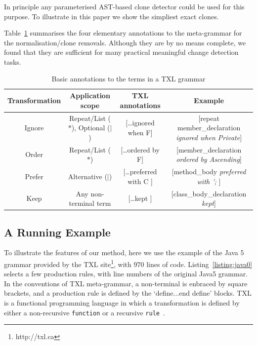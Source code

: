\documentclass[10pt, conference, compsocconf]{IEEEtran}
\begin{document}
In principle any parameterised AST-based clone detector could be used for this purpose. To illustrate in this paper we show the simpliest exact clones.

Table~\ref{table:rule} summarises the four elementary annotations to the meta-grammar for the normalisation/clone removals. Although they are by no means complete, we found that they are sufficient for many practical meaningful change detection tasks.
\begin{table}\centering
\caption{Basic annotations to the terms in a TXL grammar}\label{table:rule}
\begin{tabular}{|c|c|c|c|}\hline
\bf Transformation & \bf Application scope & \bf TXL annotations & \bf Example \\\hline\hline
Ignore & Repeat/List ($*$), Optional ($|$) & [\ldots ignored when F] & [repeat member\_declaration \emph{ignored when Private}]\\\hline
Order & Repeat/List ($*$) & [\ldots ordered by F] & [member\_declaration \emph{ordered by Ascending}] \\\hline
Prefer & Alternative ($|$) & [\ldots preferred with C ] & [method\_body \emph{preferred with '; }] \\\hline
Keep & Any non-terminal term & [\ldots kept ] & [class\_body\_declaration \emph{kept}] \\\hline
\end{tabular}
\end{table}

\subsection{A Running Example}\label{sec:example}
To illustrate the features of our method, here we use the example of the Java 5 grammar provided by the TXL site\footnote{http://txl.ca}, with 970 lines of code. Listing~\ref{listing:java0} selects a few production rules, with line numbers of the original Java5 grammar. In the conventions of TXL meta-grammar, a non-terminal is enbraced by square brackets, and a production rule is defined by the `define...end define' blocks. TXL is a functional programming language in which a transformation is defined by either a non-recursive {\tt function} or a recursive {\tt rule}~\cite{txl}.



\end{document}
